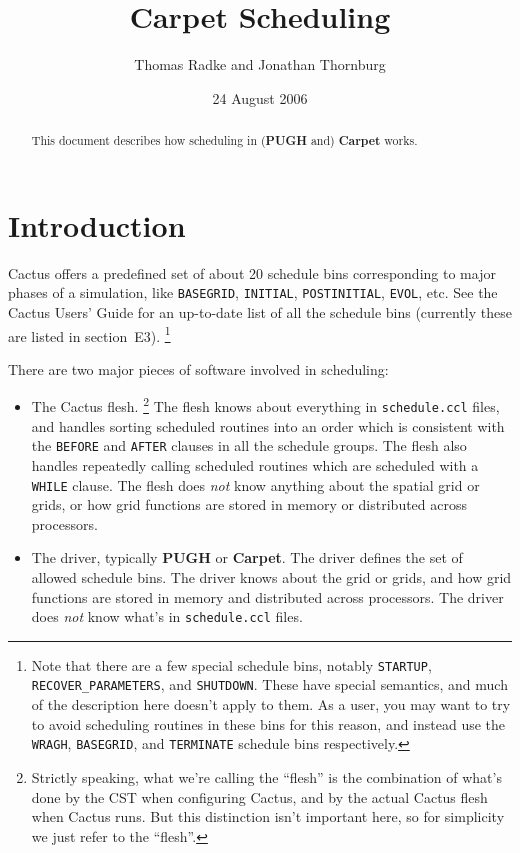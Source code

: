 \documentclass{article}
\def\thorn#1{\textbf{#1}}
\begin{document}
\author{Thomas Radke and Jonathan Thornburg}
\title{Carpet Scheduling}
\date{24 August 2006}
\maketitle
\begin{abstract}
This document describes how scheduling in (\thorn{PUGH} and)
\thorn{Carpet} works.
\end{abstract}


\section{Introduction}

Cactus offers a predefined set of about 20 schedule bins corresponding
to major phases of a simulation, like \verb|BASEGRID|, \verb|INITIAL|,
\verb|POSTINITIAL|, \verb|EVOL|, etc.  See the Cactus Users' Guide for
an up-to-date list of all the schedule bins (currently these are listed
in section~E3).%
\footnote{%
	 Note that there are a few special schedule bins, notably
	 \texttt{STARTUP}, \texttt{RECOVER\_PARAMETERS}, and
	 \texttt{SHUTDOWN}.  These have special semantics, and much
	 of the description here doesn't apply to them.  As a user,
	 you may want to try to avoid scheduling routines in these
	 bins for this reason, and instead use the \texttt{WRAGH},
	 \texttt{BASEGRID}, and \texttt{TERMINATE} schedule bins
	 respectively.
	 }%

There are two major pieces of software involved in scheduling:
\begin{itemize}
\item	The Cactus flesh.%
\footnote{%
	 Strictly speaking, what we're calling the ``flesh'' is
	 the combination of what's done by the CST when configuring
	 Cactus, and by the actual Cactus flesh when Cactus runs.
	 But this distinction isn't important here, so for simplicity
	 we just refer to the ``flesh''.
	 }%
{}	The flesh knows about everything in \verb|schedule.ccl| files,
	and handles sorting scheduled routines into an order which is
	consistent with the \verb|BEFORE| and \verb|AFTER| clauses in
	all the schedule groups.  The flesh also handles repeatedly
	calling scheduled routines which are scheduled with a
	\verb|WHILE| clause.  The flesh does \emph{not} know anything
	about the spatial grid or grids, or how grid functions are
	stored in memory or distributed across processors.
\item	The driver, typically \thorn{PUGH} or \thorn{Carpet}.
	The driver defines the set of allowed schedule bins.
	The driver knows about the grid or grids, and how grid functions
	are stored in memory and distributed across processors.
	The driver does \emph{not} know what's in \verb|schedule.ccl| files.
\end{itemize}
\end{document}
